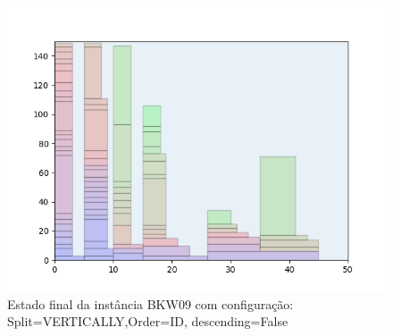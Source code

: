 \begin{figure}[H]
    \centering
    \caption[]{Estado final da instância BKW09 com configuração: Split=VERTICALLY,Order=ID, descending=False}
    \label{fig:bkw09-vertically-id-false}
    \includegraphics[scale=0.5]{output/figures/bkw/bkw09/vertically/id/false/000}
\end{figure}